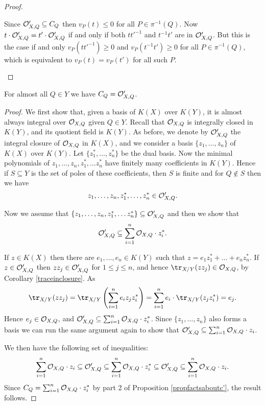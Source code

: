 \begin{proof}
\begin{enumerate}
        
        
        Since ${\cal O}_{X,Q}'\subseteq C_Q$ then $v_P(t)\leq 0$ for all $P\in \pi^{-1}(Q)$.
        Now $t\cdot {\cal O}_{X,Q}' = t'\cdot {\cal O}_{X,Q}'$ if and only if both $tt'^{-1}$ and $t^{-1}t'$ are in ${\cal O}_{X,Q}'$.
        But this is the case if and only $v_P(tt'^{-1}) \geq 0$ and $v_P(t^{-1}t')\geq 0$ for all $P\in \pi^{-1}(Q)$, which is equivalent to $v_P(t)=v_P(t')$ for all such $P$.
        \end{enumerate}
    \end{proof}

    \begin{prop}\label{almostallqiny}
    For almost all $Q\in Y$ we have $C_Q= {\cal O}_{X,Q}'$.
    \end{prop}
    \begin{proof}
    We first show that, given a basis of $K(X)$ over $K(Y)$, it is almost always integral over ${\cal O}_{X,Q}$ given $Q\in Y$.
    Recall that ${\cal O}_{X,Q}$ is integrally closed in $K(Y)$, and its quotient field is $K(Y)$.
    As before, we denote by ${\cal O}_{X,Q}'$ the integral closure of ${\cal O}_{X,Q}$ in $K(X)$, and we consider a basis $\{z_1,\ldots ,z_n\}$ of $K(X)$ over $K(Y)$.
    Let $\{z_1^*,\ldots ,z_n^*\}$ be the dual basis.
    Now the minimal polynomials of $z_1,\ldots, z_n,z_1^*,\ldots z_n^*$ have finitely many coefficients in $K(Y)$.
    Hence if $S\subseteq Y$ is the set of poles of these coefficients, then $S$ is finite and for $Q\notin S$ then we have
        \[
        z_1,\ldots,z_n,z_1^*,\ldots, z_n^*\in {\cal O}_{X,Q}'.
        \]
    
    Now we assume that $\{z_1,\ldots ,z_n,z_1^*,\ldots z_n^*\}\subseteq {\cal O}_{X,Q}'$ and then we show that 
        \[
        {\cal O}_{X,Q}' \subseteq \sum_{i=1}^n {\cal O}_{X,Q}\cdot z_i^*.
        \]
    
    If $z\in K(X)$ then there are $e_1,\ldots, e_n\in K(Y)$ such that $z=e_1z_1^*+\ldots +e_nz_n^*$.
    If $z\in {\cal O}_{X,Q}'$ then $zz_j\in {\cal O}_{X,Q}'$ for $1\leq j\leq n$, and hence $\tr_{X/Y}(zz_j)\in \cO_{X,Q}$, by Corollary \ref{traceinclosure}.
    As
        \[
        \tr_{X/Y}(zz_j) = \tr_{X/Y}\left(\sum_{i=1}^n e_iz_jz_i^*\right) = \sum_{i=1}^ne_i\cdot \tr_{X/Y}(z_jz_i^*) = e_j.
        \]
    Hence $e_j\in {\cal O}_{X,Q}$, and ${\cal O}_{X,Q}'\subseteq \sum_{i=1}^n{\cal O}_{X,Q}\cdot z_i^*$.
    Since $\{z_1,\ldots, z_n\}$ also forms a basis we can run the same argument again to show that ${\cal O}_{X,Q}'\subseteq \sum_{i=1}^n{\cal O}_{X,Q}\cdot z_i$.
    
    We then have the following set of inequalities:
        \[
        \sum_{i=1}^n {\cal O}_{X,Q}\cdot z_i \subseteq {\cal O}_{X,Q}' \subseteq \sum_{i=1}^n{\cal O}_{X,Q}\cdot z_i^* \subseteq {\cal O}_{X,Q}'\subseteq \sum_{i=1}^n {\cal O}_{X,Q}\cdot z_i.
        \]
    Since $C_Q = \sum_{i=1}^n {\cal O}_{X,Q}\cdot z_i^*$ by part 2 of Proposition \ref{propfactsaboutc'}, the result follows.
    \end{proof}


